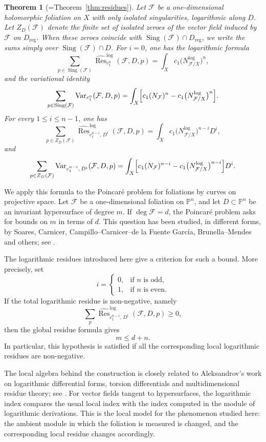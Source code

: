 \documentclass[12pt,reqno,a4paper]{amsart}
\numberwithin{equation}{section}
\theoremstyle{plain}
\newtheorem{theorem}{Theorem}[section]
\theoremstyle{definition}
\DeclareMathOperator{\Sing}{Sing}
\newcommand{\cF}{\mathcal{F}}
\begin{document}
\begin{theorem}[=Theorem~\ref{thm:residues}]
Let \(\cF\) be a one-dimensional holomorphic foliation on \(X\) with only
isolated singularities, logarithmic along \(D\). Let \(Z_D(\cF)\) denote the
finite set of isolated zeroes of the vector field induced by \(\cF\) on
\(D_{\mathrm{reg}}\). When these zeroes coincide with
\(\Sing(\cF)\cap D_{\mathrm{reg}}\), we write the sums simply over
\(\Sing(\cF)\cap D\).
For \(i=0\), one has the logarithmic formula
\[
\sum_{p\in \Sing(\cF)}
\widehat{\operatorname{Res}}^{\log}_{c_1^n}(\cF,D,p)
=
\int_X c_1\bigl(N^{\log}_{\cF/X}\bigr)^n,
\]
and the variational identity
\[
\sum_{p\in \Sing(\cF)}
\operatorname{Var}_{c_1^n}(\cF,D,p)
=
\int_X
\Bigl[
c_1(N_{\cF})^n
-
c_1\bigl(N^{\log}_{\cF/X}\bigr)^n
\Bigr].
\]
For every \(1\leq i\leq n-1\), one has
\[
\sum_{p\in Z_D(\cF)}
\widehat{\operatorname{Res}}^{\log}_{c_1^{n-i},\,D^i}
(\cF,D,p)
=
\int_X c_1\bigl(N^{\log}_{\cF/X}\bigr)^{n-i}D^i,
\]
and
\[
\sum_{p\in Z_D(\cF)}
\operatorname{Var}_{c_1^{n-i},\,D^i}
(\cF,D,p)
=
\int_X
\Bigl[
c_1(N_{\cF})^{n-i}
-
c_1\bigl(N^{\log}_{\cF/X}\bigr)^{n-i}
\Bigr]D^i.
\]
\end{theorem}

We apply this formula to the Poincar\'e problem for foliations by curves on
projective space. Let \(\cF\) be a one-dimensional foliation on
\(\mathbb P^n\), and let \(D\subset\mathbb P^n\) be an invariant hypersurface
of degree \(m\). If \(\deg\cF=d\), the Poincar\'e problem asks for bounds on
\(m\) in terms of \(d\). This question has been studied, in different forms, by
Soares, Carnicer, Campillo--Carnicer--de la Fuente Garc\'ia, Brunella--Mendes
and others; see \cite{BM,CC,Carnicer,CJ,CoMa2,Esteves,So,So0}.

The logarithmic residues introduced here give a   criterion for such a
bound. More precisely, set
\[
i=
\begin{cases}
0, & \text{if } n \text{ is odd},\\
1, & \text{if } n \text{ is even}.
\end{cases}
\]
If the total logarithmic residue is non-negative, namely
\[
\sum_p
\widehat{\operatorname{Res}}^{\log}_{c_1^{n-i},\,D^i}
(\cF,D,p)\geq 0,
\]
then the global residue formula gives
\[
m\leq d+n.
\]
In particular, this hypothesis is satisfied if all the corresponding local
logarithmic residues are non-negative.

The local algebra behind the construction is closely related to Aleksandrov's
work on logarithmic differential forms, torsion differentials and
multidimensional residue theory; see \cite{Alex1,Ale_s}. For vector fields
tangent to hypersurfaces, the logarithmic index compares the usual local index
with the index computed in the module of logarithmic derivations. This is the
local model for the phenomenon studied here: the ambient module in which the
foliation is measured is changed, and the corresponding local residue changes
accordingly.
\end{document}
